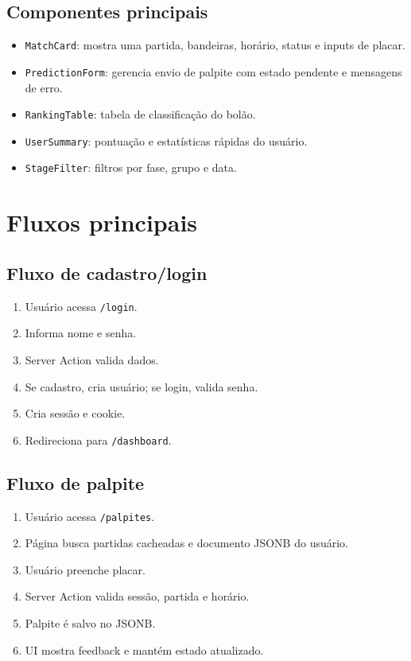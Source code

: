 \documentclass[12pt,a4paper]{article}
\begin{document}
\subsection{Componentes principais}

\begin{itemize}
  \item \texttt{MatchCard}: mostra uma partida, bandeiras, horário, status e inputs de placar.
  \item \texttt{PredictionForm}: gerencia envio de palpite com estado pendente e mensagens de erro.
  \item \texttt{RankingTable}: tabela de classificação do bolão.
  \item \texttt{UserSummary}: pontuação e estatísticas rápidas do usuário.
  \item \texttt{StageFilter}: filtros por fase, grupo e data.
\end{itemize}

\section{Fluxos principais}

\subsection{Fluxo de cadastro/login}

\begin{enumerate}
  \item Usuário acessa \texttt{/login}.
  \item Informa nome e senha.
  \item Server Action valida dados.
  \item Se cadastro, cria usuário; se login, valida senha.
  \item Cria sessão e cookie.
  \item Redireciona para \texttt{/dashboard}.
\end{enumerate}

\subsection{Fluxo de palpite}

\begin{enumerate}
  \item Usuário acessa \texttt{/palpites}.
  \item Página busca partidas cacheadas e documento JSONB do usuário.
  \item Usuário preenche placar.
  \item Server Action valida sessão, partida e horário.
  \item Palpite é salvo no JSONB.
  \item UI mostra feedback e mantém estado atualizado.
\end{enumerate}
\end{document}
